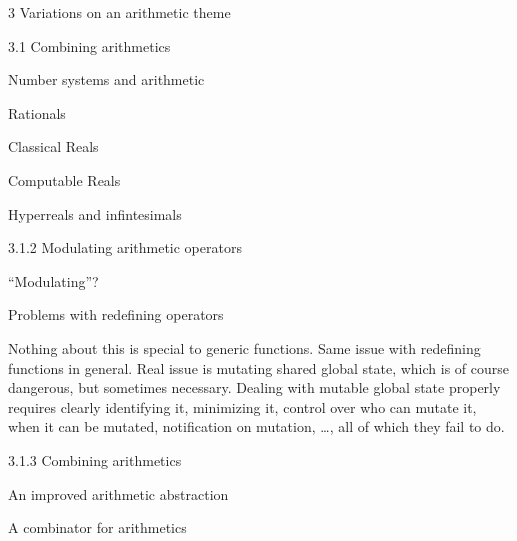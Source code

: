 \documentclass[12pt]{PalisadesLakesBook}
\begin{document}
\begin{plSection}{3 Variations on an arithmetic theme}
\begin{plSection}{3.1 Combining arithmetics}
\begin{plSection}{Number systems and arithmetic}
\begin{plSection}{Rationals}
\end{plSection}%
\begin{plSection}{Classical Reals}


\end{plSection}%
\begin{plSection}{Computable Reals}

\end{plSection}%
\begin{plSection}{Hyperreals and infintesimals}

\end{plSection}%


\end{plSection}%
\begin{plSection}{3.1.2 Modulating arithmetic operators}

``Modulating''?

\begin{plSection}{Problems with redefining operators}

Nothing about this is special to generic functions.
Same issue with redefining functions in general.
Real issue is mutating shared global state,
which is of course dangerous, but sometimes necessary.
Dealing with mutable global state properly requires
clearly identifying it, minimizing it,
control over who can mutate it,
when it can be mutated,
notification on mutation, {\ldots},
all of which they fail to do.

\end{plSection}%
\end{plSection}%
\begin{plSection}{3.1.3 Combining arithmetics}
\begin{plSection}{An improved arithmetic abstraction}
\end{plSection}%
\begin{plSection}{A combinator for arithmetics}


\end{plSection}
\end{plSection}
\end{plSection}
\end{plSection}
\end{document}
